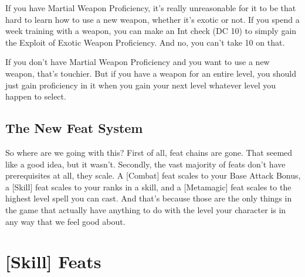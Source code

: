 If you have Martial Weapon Proficiency, it's really unreasonable for it to be that hard to learn how to use a new weapon, whether it's exotic or not. If you spend a week training with a weapon, you can make an Int check (DC 10) to simply gain the Exploit of Exotic Weapon Proficiency. And no, you can't take 10 on that.

If you don't have Martial Weapon Proficiency and you want to use a new weapon, that's touchier. But if you have a weapon for an entire level, you should just gain proficiency in it when you gain your next level whatever level you happen to select.

\subsection{The New Feat System}

So where are we going with this? First of all, feat chains are gone. That seemed like a good idea, but it wasn't. Secondly, the vast majority of feats don't have prerequisites at all, they scale. A [Combat] feat scales to your Base Attack Bonus, a [Skill] feat scales to your ranks in a skill, and a [Metamagic] feat scales to the highest level spell you can cast. And that's because those are the only things in the game that actually have anything to do with the level your character is in any way that we feel good about.




\section{[Skill] Feats}

